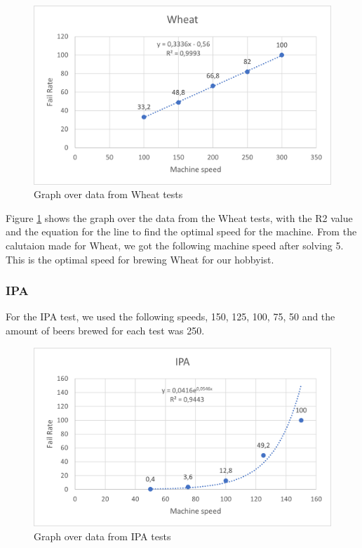 \begin{center}
    \centering
    \begin{figure}[H]
        \includegraphics[width=1\textwidth]{img/Wheat_graph.png}
        \caption{Graph over data from Wheat tests}
        \label{fig:Wheat_graph}
    \end{figure}
\end{center}

Figure \ref{fig:Wheat_graph} shows the graph over the data from the Wheat tests, with the R2 value and the equation for the line to find the optimal speed for the machine. \newline
From the calutaion made for Wheat, we got the following machine speed after solving 5. This is the optimal speed for brewing Wheat for our hobbyist. \newline

\subsubsection{IPA}
For the IPA test, we used the following speeds, 150, 125, 100, 75, 50 and the amount of beers brewed for each test was 250.

\begin{center}
    \centering
    \begin{figure}[H]
        \includegraphics[width=1\textwidth]{img/IPA_graph.png}
        \caption{Graph over data from IPA tests}
        \label{fig:IPA_graph}
    \end{figure}
\end{center}

